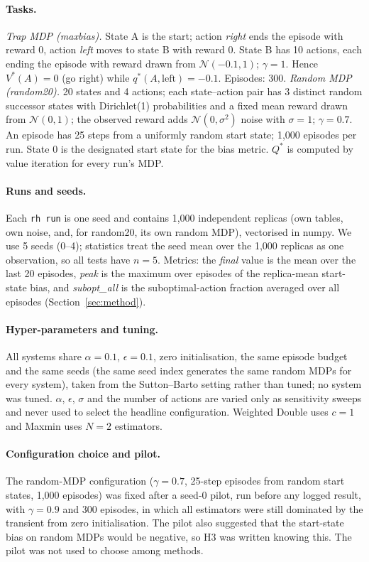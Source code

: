 \paragraph{Tasks.} \emph{Trap MDP (maxbias).} State A is the start; action \emph{right} ends the episode with reward 0, action \emph{left} moves to state B with reward 0. State B has 10 actions, each ending the episode with reward drawn from $\mathcal N(-0.1,1)$; $\gamma=1$. Hence $V^\ast(A)=0$ (go right) while $q^\ast(A,\text{left})=-0.1$. Episodes: 300. \emph{Random MDP (random20).} 20 states and 4 actions; each state--action pair has 3 distinct random successor states with Dirichlet(1) probabilities and a fixed mean reward drawn from $\mathcal N(0,1)$; the observed reward adds $\mathcal N(0,\sigma^2)$ noise with $\sigma=1$; $\gamma=0.7$. An episode has 25 steps from a uniformly random start state; 1,000 episodes per run. State 0 is the designated start state for the bias metric. $Q^\ast$ is computed by value iteration for every run's MDP.

\paragraph{Runs and seeds.} Each \texttt{rh run} is one seed and contains 1,000 independent replicas (own tables, own noise, and, for random20, its own random MDP), vectorised in numpy. We use 5 seeds (0--4); statistics treat the seed mean over the 1,000 replicas as one observation, so all tests have $n=5$. Metrics: the \emph{final} value is the mean over the last 20 episodes, \emph{peak} is the maximum over episodes of the replica-mean start-state bias, and \emph{subopt\_all} is the suboptimal-action fraction averaged over all episodes (Section~\ref{sec:method}).

\paragraph{Hyper-parameters and tuning.} All systems share $\alpha=0.1$, $\epsilon=0.1$, zero initialisation, the same episode budget and the same seeds (the same seed index generates the same random MDPs for every system), taken from the Sutton--Barto setting rather than tuned; no system was tuned. $\alpha$, $\epsilon$, $\sigma$ and the number of actions are varied only as sensitivity sweeps and never used to select the headline configuration. Weighted Double uses $c=1$ and Maxmin uses $N=2$ estimators.

\paragraph{Configuration choice and pilot.} The random-MDP configuration ($\gamma=0.7$, 25-step episodes from random start states, 1,000 episodes) was fixed after a seed-0 pilot, run before any logged result, with $\gamma=0.9$ and 300 episodes, in which all estimators were still dominated by the transient from zero initialisation. The pilot also suggested that the start-state bias on random MDPs would be negative, so H3 was written knowing this. The pilot was not used to choose among methods.

